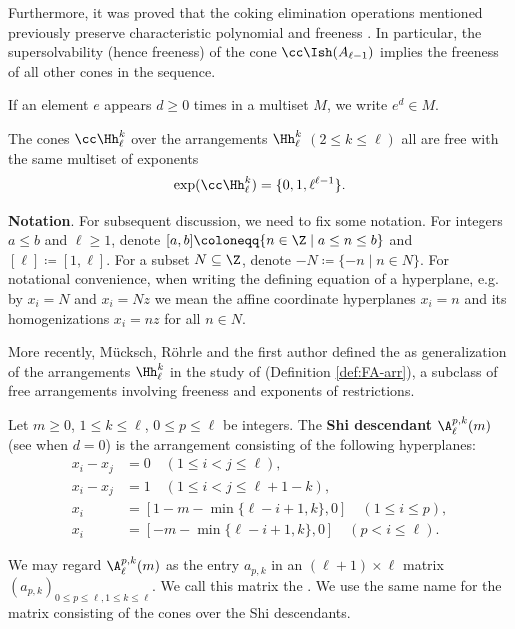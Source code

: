 Furthermore, it was proved that the coking elimination operations mentioned previously preserve characteristic polynomial and freeness  \cite[Theorems 3.1 and 4.1]{ATT24}. 
In particular, the supersolvability (hence freeness) of the cone $\cc\Ish(A_{\ell-1}) $ implies the freeness of all other cones in the sequence.

 If an element $e$ appears $d\ge0$ times  in a multiset $M$, we  write $e^d \in M$.

\begin{theorem}\label{Shi/Ish interpolation}
The cones $\cc\Hh_{\ell}^{k}$ over the arrangements $\Hh_{\ell}^{k}$ $(2 \leq k \leq \ell)$ all are free with the same multiset of exponents 
$$\exp(\cc\Hh_{\ell}^{k}) = \{0,1, \ell^{\ell-1} \}.$$ 
\end{theorem}
 
 
\textbf{Notation}. For subsequent discussion, we need to fix some notation. 
 For integers $a\le b$ and $\ell\ge1$, denote $[a,b] \coloneqq \{n\in\Z\mid a \le n\le b\}$ and $[\ell] \coloneqq [1,\ell]$. 
For a subset $N\subseteq \Z$, denote $-N \coloneqq \{-n\mid n\in N\}.$ 
For notational convenience,  when writing the defining equation of a hyperplane, e.g. by $x_{i} =N$ and  $x_{i} =  Nz$ we mean the affine coordinate hyperplanes $x_{i}=n$ and its homogenizations $x_{i} =nz$ for all  $ n \in N$. 

More recently, M\"ucksch, R\"ohrle and the first author  \cite{MRT24} defined the  as generalization of the arrangements $\Hh_{\ell}^{k}$ in the study of   (Definition \ref{def:FA-arr}), a subclass of free arrangements involving freeness and exponents of restrictions.

Let  $m\ge 0$, $1 \le k \le \ell$, $0 \le p \le \ell$ be integers. 
The \textbf{Shi descendant} $\A^{p,k}_\ell(m)  $ (see \cite[Definition 7.15]{MRT24} when $d=0$) is the arrangement consisting of the following hyperplanes:
\begin{align*}
x_{i} - x_{j} &= 0\quad  (1 \leq i < j \leq \ell), \\
x_{i} - x_{j} &= 1 \quad (1 \leq i < j \leq \ell+1-k), \\
x_i&= [1- m-\min\{\ell-i+1, k\}  , 0 ]  \quad (1 \leq   i \leq p), \\
x_i&= [- m-\min\{\ell-i+1, k\}   , 0]  \quad (p<  i \leq \ell).
\end{align*}

We may regard $\A^{p,k}_\ell (m)$ as the entry $a_{p,k}$ in an $(\ell+1)\times \ell$ matrix $(a_{p,k})_{0 \le p \le \ell, 1 \le k \le \ell}$. 
We call this matrix the  . 
We use the same name for the matrix consisting of the cones over the Shi descendants.

